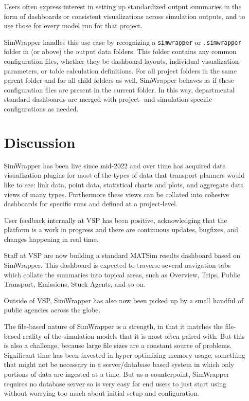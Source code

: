 Users often express interest in setting up standardized output summaries in the form of dashboards or consistent visualizations across simulation outputs, and to use those for every model run for that project.

SimWrapper handles this use case by recognizing a \texttt{simwrapper} or \texttt{.simwrapper} folder in (or above) the output data folders. This folder contains any common configuration files, whether they be dashboard layouts, individual visualization parameters, or table calculation definitions. For all project folders in the same parent folder and for all child folders as well, SimWrapper behaves as if these configuration files are present in the current folder. In this way, departmental standard dashboards are merged with project- and simulation-specific configurations as needed.


\hypertarget{simwrapper-discussion}{%
\section{Discussion}\label{simwrapper-discussion}}

SimWrapper has been live since mid-2022 and over time has acquired data visualization plugins for most of the types of data that transport planners would like to see: link data, point data, statistical charts and plots, and aggregate data views of many types. Furthermore these views can be collated into cohesive dashboards for specific runs and defined at a project-level.

User feedback internally at VSP has been positive, acknowledging that the platform is a work in progress and there are continuous updates, bugfixes, and changes happening in real time.

Staff at VSP are now building a standard MATSim results dashboard based on SimWrapper. This dashboard is expected to traverse several navigation tabs which collate the summaries into topical areas, such as Overview, Trips, Public Transport, Emissions, Stuck Agents, and so on.

Outside of VSP, SimWrapper has also now been picked up by a small handful of public agencies across the globe.

The file-based nature of SimWrapper is a strength, in that it matches the file-based reality of the simulation models that it is most often paired with. But this is also a challenge, because large file sizes are a constant source of problems. Significant time has been invested in hyper-optimizing memory usage, something that might not be necessary in a server/database based system in which only portions of data are ingested at a time. But as a counterpoint, SimWrapper requires no database server so is very easy for end users to just start using without worrying too much about initial setup and configuration.

